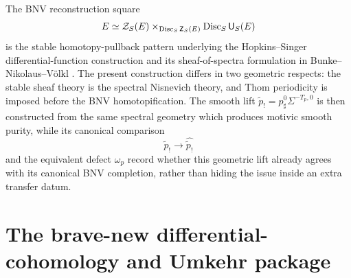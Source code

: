 \begin{remark}
The BNV reconstruction square
\[
  E\simeq
  \mathcal Z_S(E)
  \times_{\operatorname{Disc}_S\mathsf Z_S(E)}
  \operatorname{Disc}_S\mathsf U_S(E)
\]
is the stable homotopy-pullback pattern underlying the Hopkins--Singer
differential-function construction and its sheaf-of-spectra formulation in
Bunke--Nikolaus--V\"olkl
\cite{HopkinsSinger2005}\cite[Proposition~3.5]{BunkeNikolausVoelkl}.  The
present construction differs in two geometric respects: the stable sheaf theory
is the spectral Nisnevich theory, and Thom periodicity is imposed before the
BNV homotopification.  The smooth lift
\(\widetilde p_!=p_\sharp^0\Sigma^{-T_p,0}\) is then constructed from the same
spectral geometry which produces motivic smooth purity, while its canonical
comparison
\[
  \widetilde p_!\longrightarrow\widehat{\widetilde p_!}
\]
and the equivalent defect \(\omega_p\) record whether this geometric lift
already agrees with its canonical BNV completion, rather than hiding the issue
inside an extra transfer datum.
\end{remark}

\section{The brave-new differential-cohomology and Umkehr package}
\label{sec:bn-diff-final}

